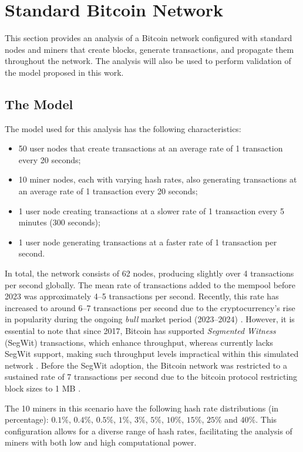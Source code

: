 \section{Standard Bitcoin Network}\label{sec:general-poc}

This section provides an analysis of a Bitcoin network configured with standard
nodes and miners that create blocks, generate transactions, and propagate them
throughout the network. The analysis will also be used to perform validation of
the model proposed in this work.

\subsection{The Model}\label{subsec:general-model}

The model used for this analysis has the following characteristics:
\begin{itemize}
	\item 50 user nodes that create transactions at an average rate of 1
		transaction every 20 seconds;
	\item 10 miner nodes, each with varying hash rates, also generating
		transactions at an average rate of 1 transaction every 20
		seconds;
	\item 1 user node creating transactions at a slower rate of 1
		transaction every 5 minutes (300 seconds);
	\item 1 user node generating transactions at a faster rate of 1
		transaction per second.
\end{itemize}

In total, the network consists of 62 nodes, producing slightly over 4
transactions per second globally. The mean rate of transactions added to the
mempool before 2023 was approximately 4--5 transactions per second. Recently,
this rate has increased to around 6--7 transactions per second due to the
cryptocurrency's rise in popularity during the ongoing \emph{bull} market
period (2023--2024) \cite{blockchaincom-tps}. However, it is essential to note
that since 2017, Bitcoin has supported \emph{Segmented Witness} (SegWit)
transactions, which enhance throughput, whereas \iblock{} currently lacks
SegWit support, making such throughput levels impractical within this simulated
network \cites{bip141, bip144}. Before the SegWit adoption, the Bitcoin network
was restricted to a sustained rate of 7 transactions per second due to the
bitcoin protocol restricting block sizes to 1 MB \cite{btcwiki-scalability}. 


The 10 miners in this scenario have the following hash rate distributions (in
percentage): \(0.1\%\), \(0.4\%\), \(0.5\%\), \(1\%\), \(3\%\), \(5\%\),
\(10\%\), \(15\%\), \(25\%\) and \(40\%\). This configuration allows for a
diverse range of hash rates, facilitating the analysis of miners with both low
and high computational power.

